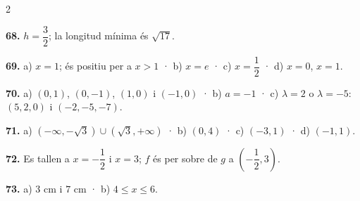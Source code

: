 \documentclass[13pt,a4paper]{extarticle}
\begin{document}
\begin{multicols}{2}
\begin{minipage}{\linewidth}
\end{minipage}\par\vspace{1.6mm}
\par\noindent\begin{minipage}{\linewidth}
\textbf{68.} $h=\dfrac32$; la longitud mínima és $\sqrt{17}$.\par
\end{minipage}\par\vspace{1.6mm}
\par\noindent\begin{minipage}{\linewidth}
\textbf{69.} a) $x=1$; és positiu per a $x>1$ · b) $x=e$ · c) $x=\dfrac12$ · d) $x=0$, $x=1$.\par
\end{minipage}\par\vspace{1.6mm}
\par\noindent\begin{minipage}{\linewidth}
\textbf{70.} a) $(0,1)$, $(0,-1)$, $(1,0)$ i $(-1,0)$ · b) $a=-1$ · c) $\lambda=2$ o $\lambda=-5$: $(5,2,0)$ i $(-2,-5,-7)$.\par
\end{minipage}\par\vspace{1.6mm}
\par\noindent\begin{minipage}{\linewidth}
\textbf{71.} a) $\left(-\infty,-\sqrt3\right)\cup\left(\sqrt3,+\infty\right)$ · b) $(0,4)$ · c) $(-3,1)$ · d) $(-1,1)$.\par
\end{minipage}\par\vspace{1.6mm}
\par\noindent\begin{minipage}{\linewidth}
\textbf{72.} Es tallen a $x=-\dfrac12$ i $x=3$; $f$ és per sobre de $g$ a $\left(-\dfrac12,3\right)$.\par
\end{minipage}\par\vspace{1.6mm}
\par\noindent\begin{minipage}{\linewidth}
\textbf{73.} a) $3$ cm i $7$ cm · b) $4\leq x\leq 6$.\par
\end{minipage}\par\vspace{1.6mm}

\end{multicols}
\end{document}
